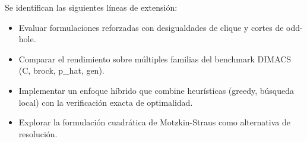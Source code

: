 Se identifican las siguientes líneas de extensión:

\begin{itemize}
    \item Evaluar formulaciones reforzadas con desigualdades de clique y cortes de odd-hole.
    \item Comparar el rendimiento sobre múltiples familias del benchmark DIMACS (C, brock, p\_hat, gen).
    \item Implementar un enfoque híbrido que combine heurísticas (greedy, búsqueda local) con la verificación exacta de optimalidad.
    \item Explorar la formulación cuadrática de Motzkin-Straus \parencite{motzkin1965} como alternativa de resolución.
\end{itemize}